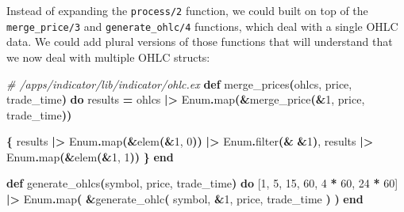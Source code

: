 \documentclass[
  oneside]{book}
\newenvironment{Shaded}{\begin{snugshade}}{\end{snugshade}}
\newcommand{\CommentTok}[1]{\textcolor[rgb]{0.56,0.35,0.01}{\textit{#1}}}
\newcommand{\ConstantTok}[1]{\textcolor[rgb]{0.56,0.35,0.01}{#1}}
\newcommand{\DecValTok}[1]{\textcolor[rgb]{0.00,0.00,0.81}{#1}}
\newcommand{\FunctionTok}[1]{\textcolor[rgb]{0.13,0.29,0.53}{\textbf{#1}}}
\newcommand{\KeywordTok}[1]{\textcolor[rgb]{0.13,0.29,0.53}{\textbf{#1}}}
\newcommand{\NormalTok}[1]{#1}
\newcommand{\OperatorTok}[1]{\textcolor[rgb]{0.81,0.36,0.00}{\textbf{#1}}}
\newcommand{\OtherTok}[1]{\textcolor[rgb]{0.56,0.35,0.01}{#1}}
\begin{document}
Instead of expanding the \texttt{process/2} function, we could built on top of the \texttt{merge\_price/3} and \texttt{generate\_ohlc/4} functions, which deal with a single OHLC data. We could add plural versions of those functions that will understand that we now deal with multiple OHLC structs:

\begin{Shaded}
\begin{Highlighting}[]
\CommentTok{\# /apps/indicator/lib/indicator/ohlc.ex}
  \KeywordTok{def}\NormalTok{ merge\_prices}\FunctionTok{(}\NormalTok{ohlcs, price, trade\_time}\FunctionTok{)} \KeywordTok{do}
\NormalTok{    results }\OperatorTok{=}
\NormalTok{      ohlcs}
      \OperatorTok{|\textgreater{}} \ConstantTok{Enum}\OperatorTok{.}\NormalTok{map}\FunctionTok{(}\OperatorTok{\&}\NormalTok{merge\_price}\FunctionTok{(}\OperatorTok{\&}\DecValTok{1}\NormalTok{, price, trade\_time}\FunctionTok{))}

    \FunctionTok{\{}
\NormalTok{      results }\OperatorTok{|\textgreater{}} \ConstantTok{Enum}\OperatorTok{.}\NormalTok{map}\FunctionTok{(}\OperatorTok{\&}\NormalTok{elem}\FunctionTok{(}\OperatorTok{\&}\DecValTok{1}\NormalTok{, }\DecValTok{0}\FunctionTok{))} \OperatorTok{|\textgreater{}} \ConstantTok{Enum}\OperatorTok{.}\NormalTok{filter}\FunctionTok{(}\OperatorTok{\&} \OperatorTok{\&}\DecValTok{1}\FunctionTok{)}\NormalTok{,}
\NormalTok{      results }\OperatorTok{|\textgreater{}} \ConstantTok{Enum}\OperatorTok{.}\NormalTok{map}\FunctionTok{(}\OperatorTok{\&}\NormalTok{elem}\FunctionTok{(}\OperatorTok{\&}\DecValTok{1}\NormalTok{, }\DecValTok{1}\FunctionTok{))}
    \FunctionTok{\}}
  \KeywordTok{end}

  \KeywordTok{def}\NormalTok{ generate\_ohlcs}\FunctionTok{(}\NormalTok{symbol, price, trade\_time}\FunctionTok{)} \KeywordTok{do}
    \OtherTok{[}\DecValTok{1}\NormalTok{, }\DecValTok{5}\NormalTok{, }\DecValTok{15}\NormalTok{, }\DecValTok{60}\NormalTok{, }\DecValTok{4} \OperatorTok{*} \DecValTok{60}\NormalTok{, }\DecValTok{24} \OperatorTok{*} \DecValTok{60}\OtherTok{]}
    \OperatorTok{|\textgreater{}} \ConstantTok{Enum}\OperatorTok{.}\NormalTok{map}\FunctionTok{(}
      \OperatorTok{\&}\NormalTok{generate\_ohlc}\FunctionTok{(}
\NormalTok{        symbol,}
        \OperatorTok{\&}\DecValTok{1}\NormalTok{,}
\NormalTok{        price,}
\NormalTok{        trade\_time}
      \FunctionTok{)}
    \FunctionTok{)}
  \KeywordTok{end}
\end{Highlighting}
\end{Shaded}
\end{document}

